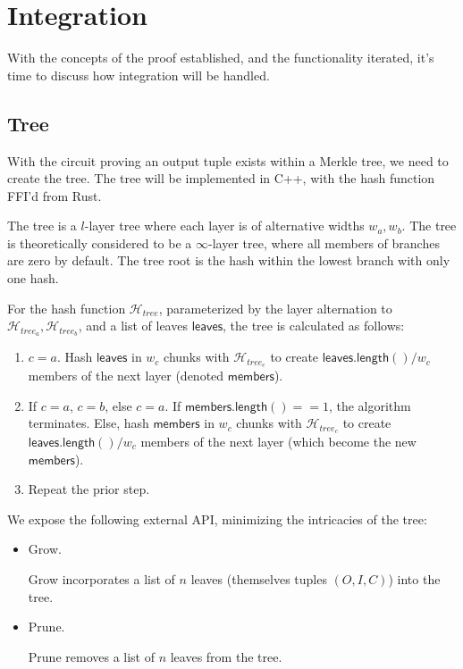 \documentclass[]{article}
\begin{document}
\section{Integration}

With the concepts of the proof established, and the functionality iterated, it's time to discuss how integration will be handled.

\subsection{Tree}

With the circuit proving an output tuple exists within a Merkle tree, we need to create the tree. The tree will be implemented in C++, with the hash function FFI'd from Rust.

The tree is a $l$-layer tree where each layer is of alternative widths $w_a, w_b$. The tree is theoretically considered to be a $\infty$-layer tree, where all members of branches are zero by default. The tree root is the hash within the lowest branch with only one hash.

For the hash function $\mathcal{H}_{tree}$, parameterized by the layer alternation to $\mathcal{H}_{tree_a}, \mathcal{H}_{tree_b}$, and a list of leaves $\mathsf{leaves}$, the tree is calculated as follows:

\begin{enumerate}
	\item $c = a$. Hash $\mathsf{leaves}$ in $w_c$ chunks with $\mathcal{H}_{tree_c}$ to create $\mathsf{leaves.length()} / w_c$ members of the next layer (denoted $\mathsf{members}$).
	\item If $c = a$, $c = b$, else $c = a$. If $\mathsf{members.length()} == 1$, the algorithm terminates. Else, hash $\mathsf{members}$ in $w_c$ chunks with $\mathcal{H}_{tree_c}$ to create $\mathsf{leaves.length()} / w_c$ members of the next layer (which become the new $\mathsf{members}$).
	\item Repeat the prior step.
\end{enumerate}

We expose the following external API, minimizing the intricacies of the tree:

\begin{itemize}
  \item Grow.
  
  Grow incorporates a list of $n$ leaves (themselves tuples $(O, I, C)$) into the tree.
  \item Prune.

  Prune removes a list of $n$ leaves from the tree.
\end{itemize}
\end{document}
